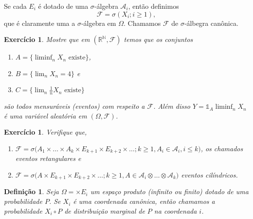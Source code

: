 \documentclass[reqno, draft]{book}
\newcommand*\1{\mathds{1}}
\newtheorem{definition}[theorem]{Definição}
\newtheorem{exercise}[example]{Exercício}
\begin{document}
Se cada $E_i$ é dotado de uma $\sigma$-álgebra $\mathcal{A}_i$, então definimos
\begin{equation}
  \mathcal{F} = \sigma(X_i; i \geq 1),
\end{equation}
que é claramente uma a $\sigma$-álgebra em $\Omega$.
Chamamos $\mathcal{F}$ de $\sigma$-álbegra canônica.

\begin{exercise}
  Mostre que em $(\mathbb{R}^{\mathbb{N}},\mathcal{F})$ temos que os conjuntos
  \begin{enumerate}[\quad a)]
  \item $A = \{ \liminf_n X_n \text{ existe}\}$,
  \item $B = \{ \lim_n X_n = 4\}$ e
  \item $C = \{ \lim_n \tfrac{1}{n} X_n \text{ existe}\}$
  \end{enumerate}
  são todos mensuráveis (eventos) com respeito a $\mathcal{F}$.
  Além disso $Y = \1_A \liminf_n X_n$ é uma variável aleatória em $(\Omega, \mathcal{F})$.
\end{exercise}

\begin{exercise}
  Verifique que,
  \begin{enumerate}[\quad a)]
  \item $\mathcal{F} = \sigma\big(A_1 \times \dots \times A_k \times E_{k+1} \times E_{k+2} \times \dots; k \geq 1, A_i \in \mathcal{A}_i, i \leq k\big)$, os chamados eventos retangulares e
  \item $\mathcal{F} = \sigma\big(A \times E_{k+1} \times E_{k+2} \times \dots; k \geq 1, A \in \mathcal{A}_i \otimes \dots \otimes \mathcal{A}_k\big)$ eventos cilíndricos.
  \end{enumerate}
\end{exercise}

\begin{definition}
  Seja $\Omega = \times E_i$ um espaço produto (infinito ou finito) dotado de uma probabilidade $P$.
  Se $X_i$ é uma coordenada canônica, então chamamos a probabilidade $X_i \circ P$ de \emph{distribuição marginal}  de $P$ na coordenada $i$.
\end{definition}

\end{document}
